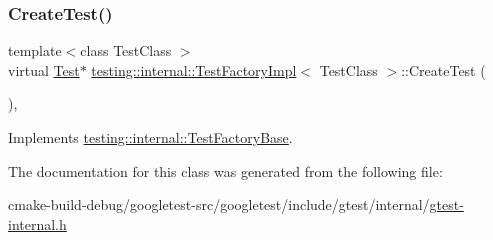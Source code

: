 \subsubsection{\texorpdfstring{CreateTest()}{CreateTest()}}
{\footnotesize\ttfamily template$<$class Test\+Class $>$ \\
virtual \mbox{\hyperlink{classtesting_1_1Test}{Test}}$\ast$ \mbox{\hyperlink{classtesting_1_1internal_1_1TestFactoryImpl}{testing\+::internal\+::\+Test\+Factory\+Impl}}$<$ Test\+Class $>$\+::Create\+Test (\begin{DoxyParamCaption}{ }\end{DoxyParamCaption})\hspace{0.3cm}{\ttfamily [inline]}, {\ttfamily [virtual]}}



Implements \mbox{\hyperlink{classtesting_1_1internal_1_1TestFactoryBase_a07ac3ca0b196cdb092da0bb186b7c030}{testing\+::internal\+::\+Test\+Factory\+Base}}.



The documentation for this class was generated from the following file\+:\begin{DoxyCompactItemize}
\item 
cmake-\/build-\/debug/googletest-\/src/googletest/include/gtest/internal/\mbox{\hyperlink{gtest-internal_8h}{gtest-\/internal.\+h}}\end{DoxyCompactItemize}
